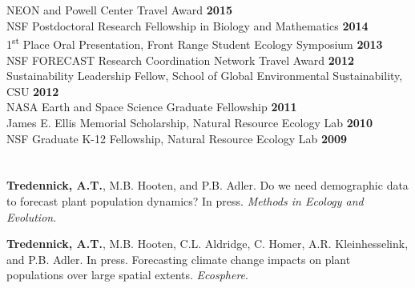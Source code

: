 \documentclass[margin,line]{resume}
\begin{document}
\begin{resume}
     \section{\textmd{\textsf{\color{MidnightBlue}{Fellowships \\and Awards}}}}
        		NEON and Powell Center Travel Award \hfill \textbf{2015}\vspace{.5mm}\\%
                NSF Postdoctoral Research Fellowship in Biology and Mathematics    \hfill \textbf{2014}\vspace{.5mm}\\%
                1\textsuperscript{st} Place Oral Presentation, Front Range Student Ecology Symposium  \hfill \textbf{2013}\vspace{.5mm}\\%
                NSF FORECAST Research Coordination Network Travel Award \hfill \textbf{2012}\vspace{.5mm}\\%
                Sustainability Leadership Fellow, School of Global Environmental Sustainability, CSU \hfill \textbf{2012}\vspace{.5mm}\\%
		NASA Earth and Space Science Graduate Fellowship  \hfill \textbf{2011}\vspace{.5mm}\\%
		James E. Ellis Memorial Scholarship, Natural Resource Ecology Lab  \hfill \textbf{2010}\vspace{.5mm}\\%
		NSF Graduate K-12 Fellowship, Natural Resource Ecology Lab                        \hfill\textbf{2009}%
   
      \section{\textmd{\textsf{\color{MidnightBlue}{Publications}}}}
	
	   \textbf{Tredennick, A.T.}, M.B. Hooten,  and P.B. Adler. Do we need demographic data to forecast plant population dynamics? In press. \emph{Methods in Ecology and Evolution}. 
	   
	  \textbf{Tredennick, A.T.}, M.B. Hooten, C.L. Aldridge, C. Homer, A.R. Kleinhesselink, and P.B. Adler. In press. Forecasting climate change impacts on plant populations over large spatial extents. \emph{Ecosphere}.
	

\end{resume}
\end{document}
